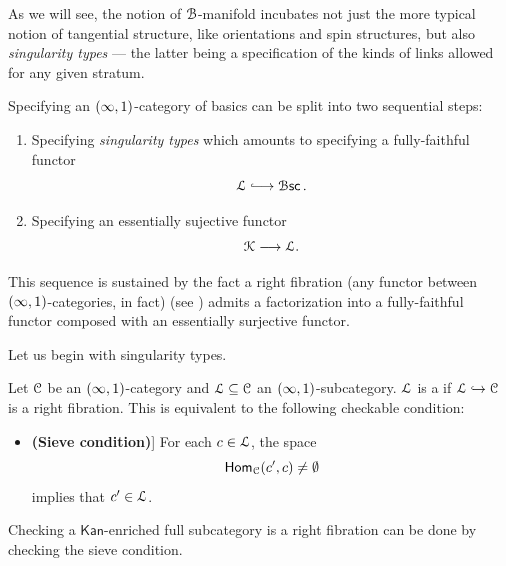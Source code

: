 \begin{observation}
As we will see, the notion of $\mathcal B$-manifold incubates not just the more typical notion of tangential structure, like orientations and spin structures, but also \emph{singularity types} — the latter being a specification of the kinds of links allowed for any given stratum.
\end{observation}

Specifying an $(\operatorname{\infty},1)$-category of basics can be split into two sequential steps:

\begin{enumerate}
    \item Specifying \emph{singularity types} which amounts to specifying a fully-faithful functor 
    \begin{equation}
        \cL \xlonghookra{\, \,\,\,} \Bsc.
    \end{equation}
    \item Specifying an essentially sujective functor 
    \begin{equation}
        \mathcal K \longrightarrow \mathcal L.
    \end{equation}
\end{enumerate}
This sequence is sustained by the fact a right fibration (any functor between $(\operatorname{\infty},1)$-categories, in fact) (see \cite[Lemma~2.8.3]{Run25}) admits a factorization into a fully-faithful functor composed with an essentially surjective functor.

Let us begin with singularity types.
\begin{definition}
    Let $\mathcal C$ be an $(\operatorname{\infty},1)$-category and $\mathcal L \subseteq \mathcal C$ an $(\operatorname{\infty},1)$-subcategory. $\mathcal L$ is a  if $\mathcal L \hookrightarrow \mathcal C$ is a right fibration. This is equivalent to the following checkable condition:
    \begin{itemize}
        \item \textbf{(Sieve condition)}] \label{con: sieve condition} For each $c \in \mathcal L$, the space 
        \begin{equation}
            \operatorname{\sf Hom}_{\mathcal C}(c',c) \neq \emptyset
        \end{equation}
        implies that $c' \in \mathcal L$.
    \end{itemize}
\end{definition}

\begin{remark}
    Checking a $\mathsf{Kan}$-enriched full subcategory is a right fibration can be done by checking the sieve condition.  
\end{remark}

